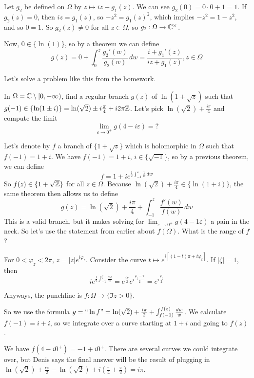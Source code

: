\documentclass[x11names,reqno,14pt]{extarticle}
\newcommand{\oo}{{\infty}}
\begin{document}
Let $g_2$ be defined on $\Omega$ by $z\mapsto iz + g_1(z)$. We can see $g_2(0) = 0\cdot0 + 1 = 1$. If $g_2(z) = 0$, then $iz = g_1(z)$, so $-z^2 = g_1(z)^2$, which implies $-z^2 = 1 - z^2$, and so $0 = 1$. So $g_2(z) \neq0$ for all $z \in \Omega$, so $g_2:\Omega\to\mathbb{C}^\times$. 


Now, $0 \in \{\ln(1)\}$, so by a theorem we can define
\[
g(z) = 0 + \int_0^z\frac{g_2'(w)}{g_2(w)}\,dw = \frac{i + g_1'(z)}{iz + g_1(z)}, z \in \Omega
\]

Let's solve a problem like this from the homework.

In $\Omega = \C\setminus[0, +\oo)$, find a regular branch $g(z)$ of $\ln(1 + \sqrt{z})$ such that $g(-1) \in \{\ln(1 \pm i)\} = \ln(\sqrt{2})\pm i \frac{\pi}{4} + i2\pi \mathbb{Z}$. Let's pick $\ln(\sqrt{2}) + \frac{i\pi}{4}$ and compute the limit
\[
\lim_{\varepsilon\to0^+}g(4 - i\varepsilon) = ?
\]

Let's denote by $f$ a branch of $\{1 + \sqrt{z}\}$ which is holomorphic in $\Omega$ such that $f(-1) = 1 + i$. We have $f(-1) = 1 + i$, $i\in \{\sqrt{-1}\}$, so by a previous theorem, we can define
\[
f = 1 + ie^{\frac{1}{2}\int_{-1}^z\frac{1}{w}\,dw}
\]
So $f(z) \in \{1 + \sqrt{\mathbb{Z}}\}$ for all $z \in \Omega$. Because $\ln(\sqrt{2}) + \frac{i\pi}{4} \in \{\ln(1 + i)\}$, the same theorem then allows us to define
\[
g(z) = \ln(\sqrt{2}) + \frac{i\pi}{4} + \int_{-1}^z\frac{f'(w)}{f(w)}\,dw
\]
This is a valid branch, but it makes solving for $\lim_{\varepsilon\to0^+}g(4 - 1\varepsilon)$ a pain in the neck. So let's use the statement from earlier about $f(\Omega)$. What is the range of $f$? 

For $0<\varphi_z<2\pi$, $z = |z|e^{i\varphi_z}$. Consider the curve $t\mapsto e^{i[(1 - t)\pi + t\varphi_\zeta]}$. If $|\zeta| = 1$, then 
\[
ie^{\frac{1}{2}\int_{-1}^\zeta\frac{dw}{w}} = e^{\frac{i\pi}{2}}e^{i\frac{\varphi_\zeta - \pi}{2}} =  e^{i\frac{\varphi_\zeta}{2}}
\]

Anyways, the punchline is $f:\Omega\to \{\Im z > 0\}$. 

So we use the formula $g = ``\ln f" = \ln(\sqrt{2}) +\frac{i\pi}{2} + \int_{f(-1)}^{f(z)}\frac{dw}{w}$. We calculate $f(-1) = i + i$, so we integrate over a curve starting at $1 + i$ and going to $f(z)$. 

We have $f(4 - i0^+) = -1 + i0^+ $. There are several curves we could integrate over, but Denis says the final answer will be the result of plugging in $\ln(\sqrt{2}) + \frac{i\pi}{2} - \ln(\sqrt{2}) + i\left(\frac{\pi}{4} + \frac{\pi}{2}\right) = i\pi$.
\end{document}
